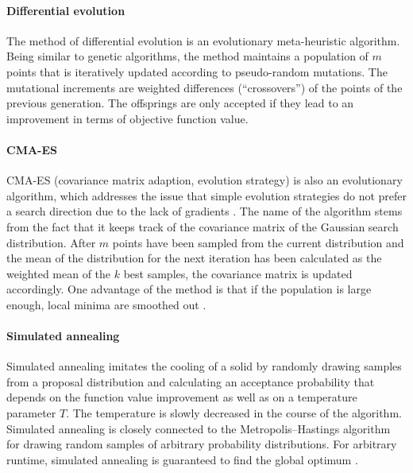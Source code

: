 \paragraph{Differential evolution}

The method of differential evolution
is an evolutionary meta-heuristic algorithm.
Being similar to genetic algorithms,
the method maintains a population of $m$ points
that is iteratively updated according to pseudo-random mutations.
The mutational increments are weighted differences (``cross\-overs'') of
the points of the previous generation.
The offsprings are only accepted if they lead to an improvement in
terms of objective function value.

\paragraph{CMA-ES}

CMA-ES (covariance matrix adaption, evolution strategy)
\cite{Hansen03Reducing}
is also an evolutionary algorithm,
which addresses the issue
that simple evolution strategies do not prefer a search direction
due to the lack of gradients \cite{Toussaint15Introduction}.
The name of the algorithm stems from the fact
that it keeps track of the covariance matrix of the
Gaussian search distribution.
After $m$ points have been sampled from the current distribution and
the mean of the distribution for the next iteration
has been calculated as the weighted mean of the $k$ best samples,
the covariance matrix is updated accordingly.
One advantage of the method is that if the population is large enough,
local minima are smoothed out \cite{Toussaint15Introduction}.

\paragraph{Simulated annealing}

Simulated annealing
imitates the cooling of a solid by randomly drawing samples
from a proposal distribution and calculating an acceptance
probability that depends on the function value improvement as well as
on a temperature parameter $T$.
The temperature is slowly decreased in the course of the algorithm.
Simulated annealing is closely connected to the
Metropolis--Hastings algorithm for drawing random samples of arbitrary
probability distributions.
For arbitrary runtime,
simulated annealing is guaranteed to find the global
optimum \cite{Toussaint15Introduction}.


